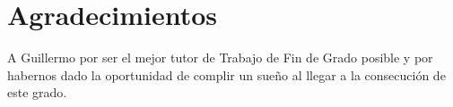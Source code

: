 
\chapter*{Agradecimientos}

A Guillermo por ser el mejor tutor de Trabajo de Fin de Grado posible y por habernos dado la oportunidad de complir un sueño al llegar a la consecución de este grado.










